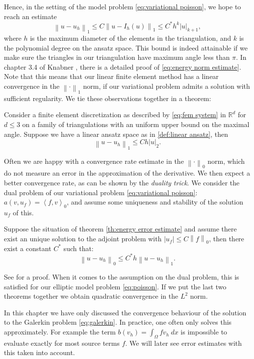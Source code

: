 \documentclass[../Main/main.tex]{subfiles}
\begin{document}
	Hence, in the setting of the model problem \eqref{eq:variational poisson}, we hope to reach an estimate
	\begin{equation}\label{eq:energy norm estimate}
		\left \| u-u_h \right \|_{1} \leq C \left \| u-I_h(u) \right \|_{1}\leq C^* h^{k}|u|_{k+1},
	\end{equation}
	where $h$ is the maximum diameter of the elements in the triangulation, and $k$ is the polynomial degree on the ansatz space.
	This bound is indeed attainable if we make sure the triangles in our triangulation have maximum angle less than $\pi$.
	In chapter 3.4 of Knabner \cite{Knabner}, there is a detailed proof of \eqref{eq:energy norm estimate}.\\
	Note that this means that our linear finite element method has a linear convergence in the $\left \| \cdot \right \|_1$ norm, if our variational problem admits a solution with sufficient regularity. We tie these observations together in a theorem:
	\begin{theorem}\label{th:energy error estimate}
		Consider a finite element discretization as described by \eqref{eq:fem system} in $\mathbb{R}^d$ for $d\leq 3$ on a family of triangulations with an uniform upper bound on the maximal angle. Suppose we have a linear ansatz space as in \ref{def:linear ansatz}, then
		\begin{equation}
			\left \| u-u_h \right \|_{1}\leq C h|u|_{2}.
		\end{equation}
	\end{theorem}
	Often we are happy with a convergence rate estimate in the $\left \| \cdot \right \|_0$ norm, which do not measure an error in the approximation of the derivative. We then expect a better convergence rate, as can be shown by the \emph{duality trick}. We consider the dual problem of our variational problem \eqref{eq:variational poisson}: $a(v,u_f) = \left \langle f,v\right \rangle_0$, and assume some uniqueness and stability of the solution $u_f$ of this. 
	\begin{theorem}[$L^2$ estimate]
		Suppose the situation of theorem \ref{th:energy error estimate} and assume there exist an unique solution to the adjoint problem with $| u_f| \leq C \left \|f \right \|_0$, then there exist a constant $C^*$ such that:
		\begin{equation}
			\left \| u - u_h \right \|_0 \leq C^* h \left \| u- u_h \right \|_1.
		\end{equation}
	\end{theorem}
	See \cite{Knabner} for a proof. When it comes to the assumption on the dual problem, this is satisfied for our elliptic model problem \ref{eq:poisson}. If we put the last two theorems together we obtain quadratic convergence in the $L^2$ norm.
	\begin{remark}
		In this chapter we have only discussed the convergence behaviour of the solution to the Galerkin problem \eqref{eq:galerkin}. In practice, one often only solves this approximately. For example the term  $b(v_h)=\int_{\Omega}fv_h \ dx$ is impossible to evaluate exactly for most source terms $f$. We will later see error estimates with this taken into account.
	\end{remark}
\end{document}

